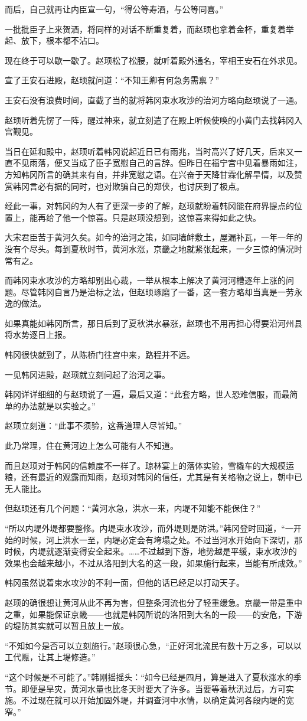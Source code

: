 而后，自己就再让内臣宣一句，“得公等寿酒，与公等同喜。”

一批批臣子上来贺酒，将同样的对话不断重复着，而赵顼也拿着金杯，重复着举起、放下，根本都不沾口。

现在终于可以歇一歇了。赵顼松了松腰，就听着殿外通名，宰相王安石在外求见。

宣了王安石进殿，赵顼就问道：“不知王卿有何急务需禀？”

王安石没有浪费时间，直截了当的就将韩冈束水攻沙的治河方略向赵顼说了一通。

赵顼听着先愣了一阵，醒过神来，就立刻遣了在殿上听候使唤的小黄门去找韩冈入宫觐见。

当日在延和殿中，赵顼听着韩冈说起近日已有雨兆，当时高兴了好几天，后来又一直不见雨落，便又当成了臣子宽慰自己的言辞。但昨日在福宁宫中见着暴雨如注，方知韩冈所言的确其来有自，并非宽慰之语。在兴奋于天降甘霖化解旱情，以及赞赏韩冈言必有据的同时，也对欺骗自己的郑侠，也讨厌到了极点。

经此一事，对韩冈的为人有了更深一步的了解，赵顼就盼着韩冈能在府界提点的位置上，能再给了他一个惊喜。只是赵顼没想到，这惊喜来得如此之快。

大宋君臣苦于黄河久矣。如今的治河之策，如同墙衅敷土，屋漏补瓦，一年一年的没有个尽头。每到夏秋时节，黄河水涨，京畿之地就紧张起来，一夕三惊的情况时常有之。

而韩冈束水攻沙的方略却别出心裁，一举从根本上解决了黄河河槽逐年上涨的问题。尽管韩冈自言乃是治标之法，但赵顼琢磨了一番，这一套方略却当真是一劳永逸的做法。

如果真能如韩冈所言，那日后到了夏秋洪水暴涨，赵顼也不用再担心得要沿河州县将水势逐日上报。

韩冈很快就到了，从陈桥门往宫中来，路程并不远。

一见韩冈进殿，赵顼就立刻问起了治河之事。

韩冈详详细细的与赵顼说了一遍，最后又道：“此套方略，世人恐难信服，而最简单的办法就是以实验之。”

赵顼立刻道：“此事不须验，这番道理人尽皆知。”

此乃常理，住在黄河边上怎么可能有人不知道。

而且赵顼对于韩冈的信赖度不一样了。琼林宴上的落体实验，雪橇车的大规模运粮，还有最近的观露而知雨，赵顼对韩冈的信任，尤其是有关格物之说上，朝中已无人能比。

但赵顼还有几个问题：“黄河水急，洪水一来，内堤不知能不能保住？”

“所以内堤外堤都要整修。内堤束水攻沙，而外堤则是防洪。”韩冈登时回道，“一开始的时候，河上洪水一至，内堤必定会有垮塌之处。不过当河水开始向下深切，那时候，内堤就逐渐变得安全起来。……不过越到下游，地势越是平缓，束水攻沙的效果也会越来越小，不过从洛阳到大名的这一段，如果施行起来，当能有所成效。”

韩冈虽然说着束水攻沙的不利一面，但他的话已经足以打动天子。

赵顼的确很想让黄河从此不再为害，但整条河流也分了轻重缓急。京畿一带是重中之重，如果能保证京畿——也就是韩冈所说的洛阳到大名的一段——的安危，下游的堤防其实就可以暂且放上一放。

“不知如今是否可以立刻施行。”赵顼很心急，“正好河北流民有数十万之多，可以以工代赈，让其上堤修造。”

“这个时候是不可能了。”韩刚摇摇头：“如今已经是四月，算是进入了夏秋涨水的季节。即便是旱灾，黄河水量也比冬天时要大了许多。当要等着秋汛过后，方可实施。不过现在就可以开始加固外堤，并调查河中水情，以确定黄河各段内堤的宽窄。”

